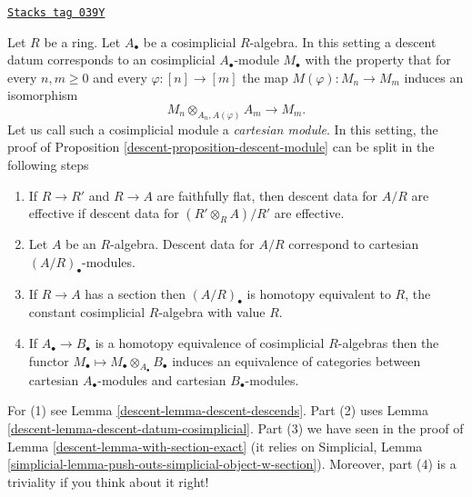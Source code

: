 \begin{remark}
\label{descent-remark-homotopy-equivalent-cosimplicial-algebras}
\href{https://stacks.math.columbia.edu/tag/039Y}{\texttt{Stacks tag 039Y}}

Let $R$ be a ring. Let $A_\bullet$ be a cosimplicial $R$-algebra.
In this setting a descent datum corresponds to an cosimplicial
$A_\bullet$-module $M_\bullet$ with the property that for
every $n, m \geq 0$ and every $\varphi : [n] \to [m]$ the
map $M(\varphi) : M_n \to M_m$ induces an isomorphism
$$
M_n \otimes_{A_n, A(\varphi)} A_m \longrightarrow M_m.
$$
Let us call such a cosimplicial module a {\it cartesian module}.
In this setting, the proof of Proposition \ref{descent-proposition-descent-module}
can be split in the following steps
\begin{enumerate}
\item If $R \to R'$ and $R \to A$ are faithfully flat,
then descent data for $A/R$ are effective if
descent data for $(R' \otimes_R A)/R'$ are effective.
\item Let $A$ be an $R$-algebra. Descent data for $A/R$ correspond
to cartesian $(A/R)_\bullet$-modules.
\item If $R \to A$ has a section then $(A/R)_\bullet$ is homotopy
equivalent to $R$, the constant cosimplicial
$R$-algebra with value $R$.
\item If $A_\bullet \to B_\bullet$ is a homotopy equivalence of
cosimplicial $R$-algebras then the functor
$M_\bullet \mapsto M_\bullet \otimes_{A_\bullet} B_\bullet$
induces an equivalence of categories between cartesian
$A_\bullet$-modules and cartesian $B_\bullet$-modules.
\end{enumerate}
For (1) see Lemma \ref{descent-lemma-descent-descends}.
Part (2) uses Lemma \ref{descent-lemma-descent-datum-cosimplicial}.
Part (3) we have seen in the proof of Lemma \ref{descent-lemma-with-section-exact}
(it relies on Simplicial,
Lemma \ref{simplicial-lemma-push-outs-simplicial-object-w-section}).
Moreover, part (4) is a triviality if you think about it right!
\end{remark}

